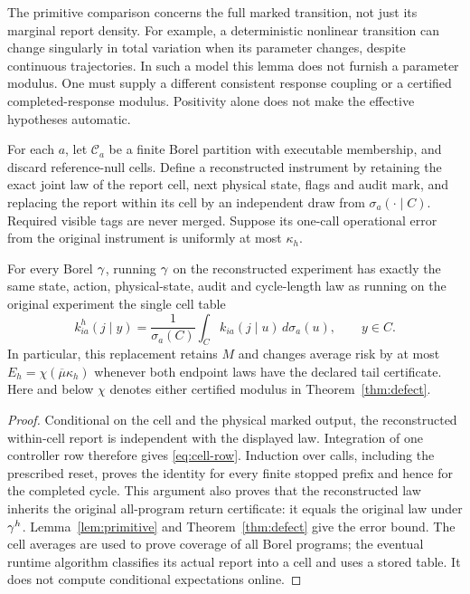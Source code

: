 The primitive comparison concerns the full marked transition, not just its marginal report density. For example, a deterministic nonlinear transition can change singularly in total variation when its parameter changes, despite continuous trajectories. In such a model this lemma does not furnish a parameter modulus. One must supply a different consistent response coupling or a certified completed-response modulus. Positivity alone does not make the effective hypotheses automatic.

\begin{lemma}\label{lem:cells}
For each $a$, let $\mathcal C_a$ be a finite Borel partition with executable membership, and discard reference-null cells. Define a reconstructed instrument by retaining the exact joint law of the report cell, next physical state, flags and audit mark, and replacing the report within its cell by an independent draw from $\sigma_a(\cdot\mid C)$. Required visible tags are never merged. Suppose its one-call operational error from the original instrument is uniformly at most $\kappa_h$.

For every Borel $\gamma$, running $\gamma$ on the reconstructed experiment has exactly the same state, action, physical-state, audit and cycle-length law as running on the original experiment the single cell table
\begin{equation}\label{eq:cell-row}
 k^h_{ia}(j\mid y)=\frac1{\sigma_a(C)}\int_Ck_{ia}(j\mid u)\,d\sigma_a(u),\qquad y\in C.
\end{equation}
In particular, this replacement retains $M$ and changes average risk by at most $E_h=\chi(\overline\mu\kappa_h)$ whenever both endpoint laws have the declared tail certificate. Here and below $\chi$ denotes either certified modulus in Theorem~\ref{thm:defect}.
\end{lemma}
\begin{proof}
Conditional on the cell and the physical marked output, the reconstructed within-cell report is independent with the displayed law. Integration of one controller row therefore gives \eqref{eq:cell-row}. Induction over calls, including the prescribed reset, proves the identity for every finite stopped prefix and hence for the completed cycle. This argument also proves that the reconstructed law inherits the original all-program return certificate: it equals the original law under $\gamma^h$. Lemma~\ref{lem:primitive} and Theorem~\ref{thm:defect} give the error bound. The cell averages are used to prove coverage of all Borel programs; the eventual runtime algorithm classifies its actual report into a cell and uses a stored table. It does not compute conditional expectations online.
\end{proof}

